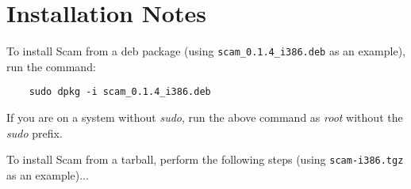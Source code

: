 \documentclass{article}
\begin{document}
%
%


\section*{Installation Notes}

To install Scam from a deb package
(using {\tt scam\_0.1.4\_i386.deb} as an example), run the command:

\begin{verbatim}
    sudo dpkg -i scam_0.1.4_i386.deb
\end{verbatim}

If you are on a system without {\it sudo}, run the above command
as {\it root} without the {\it sudo} prefix.

To install Scam from a tarball, perform the following steps
(using {\tt scam-i386.tgz} as an example)...
\end{document}
